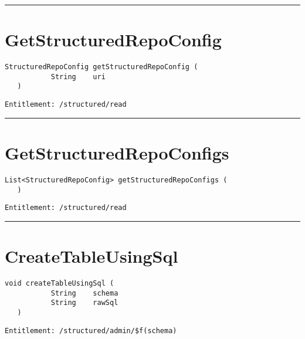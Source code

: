 \rule{12cm}{2pt}
\section{GetStructuredRepoConfig}
\label{Api:GetStructuredRepoConfig}
\begin{lstlisting}[style=nonumbers]
   StructuredRepoConfig getStructuredRepoConfig (
           String    uri
   )
\end{lstlisting}
\begin{Verbatim}[formatcom=\color{Maroon}]
  Entitlement: /structured/read
\end{Verbatim}



\rule{12cm}{2pt}
\section{GetStructuredRepoConfigs}
\label{Api:GetStructuredRepoConfigs}
\begin{lstlisting}[style=nonumbers]
   List<StructuredRepoConfig> getStructuredRepoConfigs (
   )
\end{lstlisting}
\begin{Verbatim}[formatcom=\color{Maroon}]
  Entitlement: /structured/read
\end{Verbatim}



\rule{12cm}{2pt}
\section{CreateTableUsingSql}
\label{Api:CreateTableUsingSql}
\begin{lstlisting}[style=nonumbers]
   void createTableUsingSql (
           String    schema
           String    rawSql
   )
\end{lstlisting}
\begin{Verbatim}[formatcom=\color{Maroon}]
  Entitlement: /structured/admin/$f(schema)
\end{Verbatim}



